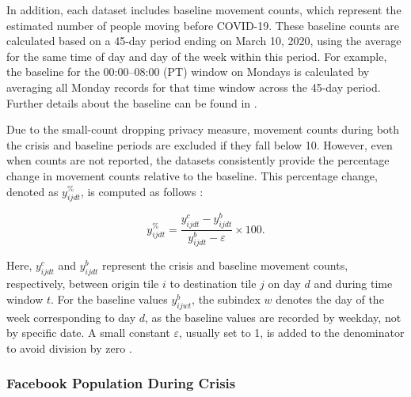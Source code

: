 \documentclass[fleqn,10pt]{wlscirep}
\begin{document}


In addition, each dataset includes baseline movement counts, which represent the estimated number of people moving before COVID-19.
These baseline counts are calculated based on a 45-day period ending on March 10, 2020, using the average for the same time of day and day of the week within this period.
For example, the baseline for the 00:00–08:00 (PT) window on Mondays is calculated by averaging all Monday records for that time window across the 45-day period.
Further details about the baseline can be found in \cite{Maas19}.

Due to the small-count dropping privacy measure, movement counts during both the crisis and baseline periods are excluded if they fall below 10.
However, even when counts are not reported, the datasets consistently provide the percentage change in movement counts relative to the baseline.
This percentage change, denoted as $y^{\%}_{ijdt}$, is computed as follows \cite{Maas19}:

\begin{equation}
y^{\%}_{ijdt} = \dfrac{y^{c}_{ijdt} - y^b_{ijdt}}{y^b_{ijdt} - \varepsilon}\times 100.
\end{equation}

Here, $y^c_{ijdt}$ and $y^b_{ijdt}$ represent the crisis and baseline movement counts, respectively, between origin tile $i$ to destination tile $j$ on day $d$ and during time window $t$.
For the baseline values $y^b_{ijwt}$, the subindex $w$ denotes the day of the week corresponding to day $d$, as the baseline values are recorded by weekday, not by specific date.
A small constant $\varepsilon$, usually set to 1, is added to the denominator to avoid division by zero \cite{Maas19}.

\subsubsection*{Facebook Population During Crisis}
\end{document}
